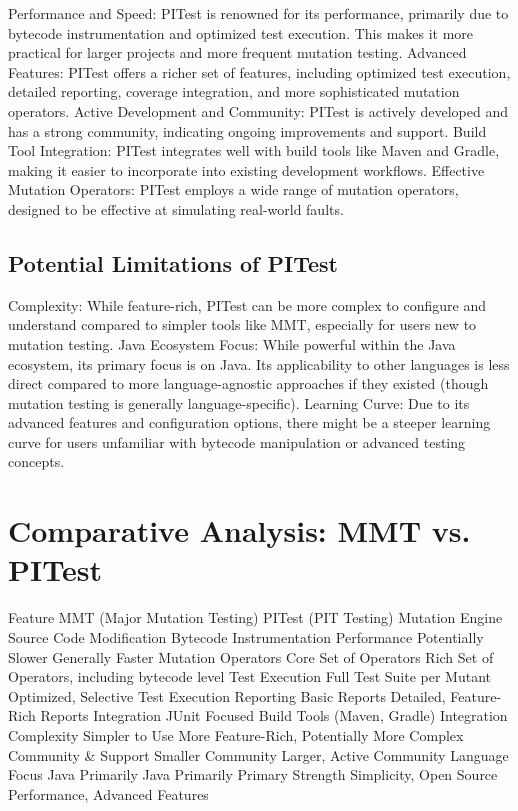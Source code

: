 \documentclass[sigplan, nonacm]{acmart}
\begin{document}
Performance and Speed: PITest is renowned for its performance, primarily due to bytecode instrumentation and optimized test execution. This makes it more practical for larger projects and more frequent mutation testing.
Advanced Features: PITest offers a richer set of features, including optimized test execution, detailed reporting, coverage integration, and more sophisticated mutation operators.
Active Development and Community: PITest is actively developed and has a strong community, indicating ongoing improvements and support.
Build Tool Integration: PITest integrates well with build tools like Maven and Gradle, making it easier to incorporate into existing development workflows.
Effective Mutation Operators: PITest employs a wide range of mutation operators, designed to be effective at simulating real-world faults.
\subsection{Potential Limitations of PITest}

Complexity: While feature-rich, PITest can be more complex to configure and understand compared to simpler tools like MMT, especially for users new to mutation testing.
Java Ecosystem Focus: While powerful within the Java ecosystem, its primary focus is on Java. Its applicability to other languages is less direct compared to more language-agnostic approaches if they existed (though mutation testing is generally language-specific).
Learning Curve: Due to its advanced features and configuration options, there might be a steeper learning curve for users unfamiliar with bytecode manipulation or advanced testing concepts.
\section{Comparative Analysis: MMT vs. PITest}

Feature	MMT (Major Mutation Testing)	PITest (PIT Testing)
Mutation Engine	Source Code Modification	Bytecode Instrumentation
Performance	Potentially Slower	Generally Faster
Mutation Operators	Core Set of Operators	Rich Set of Operators, including bytecode level
Test Execution	Full Test Suite per Mutant	Optimized, Selective Test Execution
Reporting	Basic Reports	Detailed, Feature-Rich Reports
Integration	JUnit Focused	Build Tools (Maven, Gradle) Integration
Complexity	Simpler to Use	More Feature-Rich, Potentially More Complex
Community \& Support	Smaller Community	Larger, Active Community
Language Focus	Java Primarily	Java Primarily
Primary Strength	Simplicity, Open Source	Performance, Advanced Features
\end{document}
